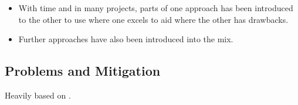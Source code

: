 \documentclass{article}
\begin{document}
\begin{itemize}
\begin{itemize}
              \item {}\cite{EvaluatingFuzzTesting}
          \end{itemize}
    \item With time and in many projects, parts of one approach has been introduced to the other to use where one excels to aid where the other has drawbacks.
    \item Further approaches have also been introduced into the mix.
\end{itemize}

\subsection{Problems and Mitigation}
Heavily based on \cite{ReviewThreeDecades, PreliminaryAssessment}.
\end{document}
